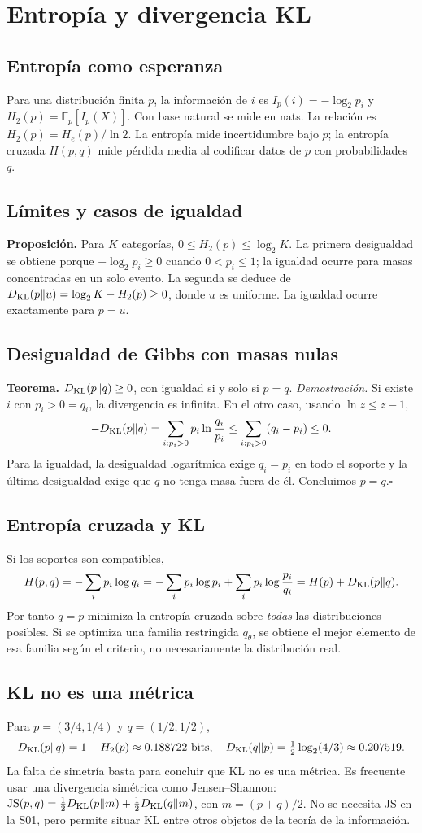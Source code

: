 \chapter{Entropía y divergencia KL}
\section{Entropía como esperanza}
Para una distribución finita $p$, la información de $i$ es
$I_p(i)=-\log_2p_i$ y $H_2(p)=\mathbb E_p[I_p(X)]$.
Con base natural se mide en nats. La relación es
$H_2(p)=H_e(p)/\ln2$. La entropía mide incertidumbre bajo $p$;
la entropía cruzada $H(p,q)$ mide pérdida media al codificar datos de $p$
con probabilidades $q$.
\section{Límites y casos de igualdad}
\textbf{Proposición.} Para $K$ categorías,
$0\le H_2(p)\le\log_2K$. La primera desigualdad se obtiene porque
$-\log_2p_i\ge0$ cuando $0<p_i\le1$; la igualdad ocurre para masas
concentradas en un solo evento. La segunda se deduce de
$D_{\rm KL}(p\|u)=\log_2K-H_2(p)\ge0$, donde $u$ es uniforme.
La igualdad ocurre exactamente para $p=u$.
\section{Desigualdad de Gibbs con masas nulas}
\textbf{Teorema.} $D_{\rm KL}(p\|q)\ge0$, con igualdad si y solo si $p=q$.
\textit{Demostración.} Si existe $i$ con $p_i>0=q_i$, la divergencia es
infinita. En el otro caso, usando $\ln z\le z-1$,
\[
-D_{\rm KL}(p\|q)=\sum_{i:p_i>0}p_i\ln\frac{q_i}{p_i}
\le\sum_{i:p_i>0}(q_i-p_i)\le0.
\]
Para la igualdad, la desigualdad logarítmica exige $q_i=p_i$ en todo el
soporte y la última desigualdad exige que $q$ no tenga masa fuera de él.
Concluimos $p=q$.\hfill$\square$
\section{Entropía cruzada y KL}
Si los soportes son compatibles,
\[
H(p,q)=-\sum_ip_i\log q_i
=-\sum_ip_i\log p_i+\sum_ip_i\log\frac{p_i}{q_i}
=H(p)+D_{\rm KL}(p\|q).
\]
Por tanto $q=p$ minimiza la entropía cruzada sobre \emph{todas} las
distribuciones posibles. Si se optimiza una familia restringida $q_\theta$,
se obtiene el mejor elemento de esa familia según el criterio, no
necesariamente la distribución real.
\section{KL no es una métrica}
Para $p=(3/4,1/4)$ y $q=(1/2,1/2)$,
\[
D_{\rm KL}(p\|q)=1-H_2(p)\approx0.188722\text{ bits},
\quad D_{\rm KL}(q\|p)=\tfrac12\log_2(4/3)\approx0.207519.
\]
La falta de simetría basta para concluir que KL no es una métrica.
Es frecuente usar una divergencia simétrica como Jensen--Shannon:
$\mathrm{JS}(p,q)=\tfrac12D_{\rm KL}(p\|m)+\tfrac12D_{\rm KL}(q\|m)$,
con $m=(p+q)/2$. No se necesita JS en la S01, pero permite situar KL
entre otros objetos de la teoría de la información.
